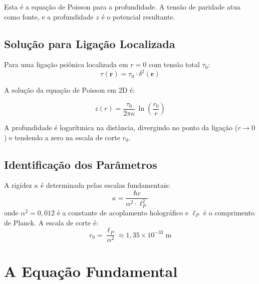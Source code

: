 \documentclass[12pt,a4paper,twoside]{article}
\newcommand{\alphaii}{\alpha^{2}}
\begin{document}
\noindent Esta \'e a equa\c{c}\~ao de Poisson para a profundidade. A tens\~ao de paridade atua como fonte, e a profundidade $z$ \'e o potencial resultante.

\subsection{Solu\c{c}\~ao para Liga\c{c}\~ao Localizada}

Para uma liga\c{c}\~ao psi\^onica localizada em $r = 0$ com tens\~ao total $\tau_0$:
\begin{equation}
\tau(\mathbf{r}) = \tau_0\cdot\delta^2(\mathbf{r})
\end{equation}

A solu\c{c}\~ao da equa\c{c}\~ao de Poisson em 2D \'e:
\begin{equationbox}[title={Profundidade Logar\'itmica}]
\begin{equation}
z(r) = \frac{\tau_0}{2\pi\kappa}\,\ln\!\left(\frac{r_0}{r}\right)
\label{eq:profundidade_log}
\end{equation}
\end{equationbox}

\noindent A profundidade \'e logar\'itmica na dist\^ancia, divergindo no ponto da liga\c{c}\~ao ($r \to 0$) e tendendo a zero na escala de corte $r_0$.

\subsection{Identifica\c{c}\~ao dos Par\^ametros}

A rigidez $\kappa$ \'e determinada pelas escalas fundamentais:
\begin{equation}
\kappa = \frac{\hbar c}{\alphaii\cdot\ell_P^2}
\label{eq:rigidez}
\end{equation}
onde $\alphaii = 0{,}012$ \'e a constante de acoplamento hologr\'afico e $\ell_P$ \'e o comprimento de Planck. A escala de corte \'e:
\begin{equation}
r_0 = \frac{\ell_P}{\alphaii} \approx 1{,}35 \times 10^{-33}\;\text{m}
\label{eq:escala_corte}
\end{equation}


\section{A Equa\c{c}\~ao Fundamental}
\end{document}

